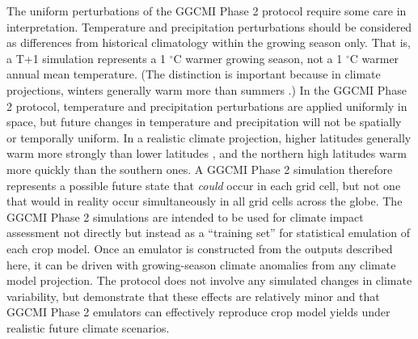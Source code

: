 \documentclass[gmd, manuscript]{copernicus} %
\begin{document}
The uniform perturbations of the GGCMI Phase 2 protocol require some care in interpretation. Temperature and precipitation perturbations should be considered as differences from historical climatology within the growing season only. That is, a T+1 simulation represents a 1 $^{\circ}$C warmer growing season, not a 1 $^{\circ}$C warmer annual mean temperature.
(The distinction is important because in climate projections, winters generally warm more than summers \citep[e.g.][]{Haugen2018}.) 
In the GGCMI Phase 2 protocol, temperature and precipitation perturbations are applied uniformly in space, but future changes in temperature and precipitation will not be spatially or temporally uniform.
In a realistic climate projection, higher latitudes generally warm more strongly than lower latitudes \citep[e.g.][]{Hansen1997}, and the northern high latitudes warm more quickly than the southern ones.
A GGCMI Phase 2 simulation therefore represents a possible future state that \textit{could} occur in each grid cell, but not one that would in reality occur simultaneously in all grid cells across the globe.  %
The GGCMI Phase 2 simulations are intended to be used for climate impact assessment not directly but instead as a ``training set'' for statistical emulation of each crop model. Once an emulator is constructed from the outputs described here, it can be driven with growing-season climate anomalies from any climate model projection.  The protocol does not involve any simulated changes in climate variability, but
\cite{Franke2020} demonstrate that these effects are relatively minor and that GGCMI Phase 2 emulators can effectively reproduce crop model yields under realistic future climate scenarios.
\end{document}
